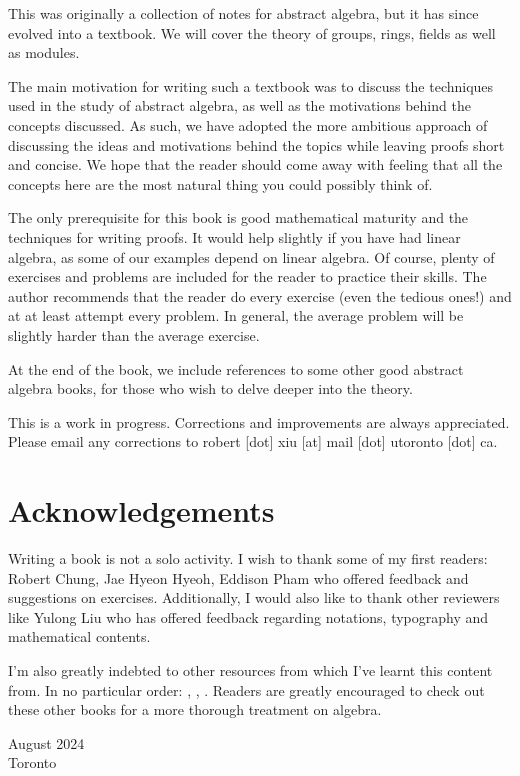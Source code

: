 \documentclass[./main.tex]{subfiles}
\begin{document}
This was originally a collection of notes for abstract algebra, but it has since
evolved into a textbook. We will cover the theory of groups, rings, fields as
well as modules. 

The main motivation for writing such a textbook was to discuss the techniques
used in the study of abstract algebra, as well as the motivations behind the
concepts discussed. As such, we have adopted the more ambitious approach of
discussing the ideas and motivations behind the topics while leaving proofs
short and concise. We hope that the reader should come away with feeling that
all the concepts here are the most natural thing you could possibly think of.

The only prerequisite for this book is good mathematical maturity and the
techniques for writing proofs. It would help slightly if you have had
linear algebra, as some of our examples depend on linear algebra. Of course,
plenty of exercises and problems are included for the reader to practice
their skills. The author recommends that the reader do every exercise (even
the tedious ones!) and at at least attempt every problem. In general, the
average problem will be slightly harder than the average exercise.

At the end of the book, we include references to some other good abstract
algebra books, for those who wish to delve deeper into the theory.

This is a work in progress. Corrections and improvements are always
appreciated. Please email any corrections to robert [dot] xiu [at] mail
[dot] utoronto [dot] ca. 

\section*{Acknowledgements}
Writing a book is not a solo activity. I wish to thank some of my first readers:
Robert Chung, Jae Hyeon Hyeoh, Eddison Pham who offered feedback and suggestions
on exercises. Additionally, I would also like to thank other reviewers like
Yulong Liu who has offered feedback regarding notations, typography and
mathematical contents.

I'm also greatly indebted to other resources from which I've learnt this content
from. In no particular order: \cite{Gallian_2020}, \cite{Dummit_Foote_2004},
\cite{Jacobson_2009}. Readers are greatly encouraged to check out these other
books for a more thorough treatment on algebra.

August 2024\\
Toronto
\end{document}
